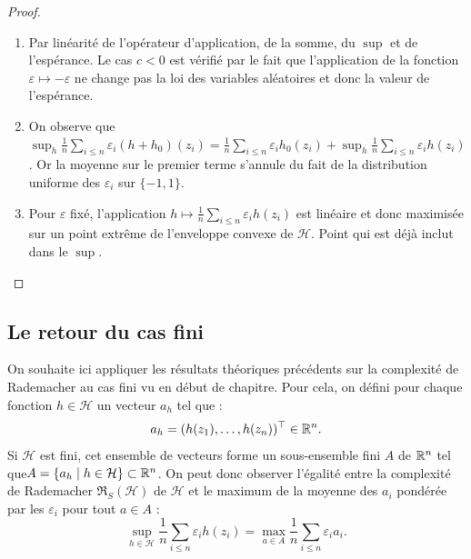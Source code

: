 \begin{proof}
    \begin{enumerate}
        \item Par linéarité de l'opérateur d'application, de la somme, du $\sup$ et de l'espérance. Le cas $c < 0$ est vérifié par le fait que l'application de la fonction $ \varepsilon \longmapsto - \varepsilon$ ne change pas la loi des variables aléatoires et donc la valeur de l'espérance. 
        \item On observe que $ \sup_h \frac{1}{n} \sum_{i \leqslant n} \varepsilon_i (h+h_0)(z_i) = \frac{1}{n} \sum_{i \leqslant n} \varepsilon_i h_0(z_i) + \sup_h \frac{1}{n} \sum_{i \leqslant n} \varepsilon_i h(z_i)$. Or la moyenne sur le premier terme s'annule du fait de la distribution uniforme des $ \varepsilon_i$ sur $\{-1, 1\}$. 
        \item Pour $ \varepsilon$ fixé, l'application $ h \longmapsto \frac{1}{n} \sum_{i \leqslant n} \varepsilon_i h(z_i)$ est linéaire et donc maximisée sur un point extrême de l'enveloppe convexe de $ \mathcal{H}$. Point qui est déjà inclut dans le $ \sup$. 
    \end{enumerate}
\end{proof}

\subsection{Le retour du cas fini}

On souhaite ici appliquer les résultats théoriques précédents sur la complexité de Rademacher au cas fini vu en début de chapitre. Pour cela, on défini pour chaque fonction $ h \in \mathcal{H}$ un vecteur $a_h$ tel que : 
\begin{equation}
    a_h = (h(z_1), \dots, h(z_n))^\top \in \mathbb{R}^n. 
\end{equation}
Si $ \mathcal{H}$ est fini, cet ensemble de vecteurs forme un sous-ensemble fini $A$ de $ \mathbb{R}^n$ tel que$ A = \{a_h \mid h \in \mathcal{H}\} \subset \mathbb{R}^n$. On peut donc observer l'égalité entre la complexité de Rademacher $\mathfrak{R}_S( \mathcal{H})$ de $ \mathcal{H}$ et le maximum de la moyenne des $a_i$ pondérée par les $ \varepsilon_i$ pour tout $a \in A$ : 
\begin{equation}
    \underset{h \in \mathcal{H}}{\sup} \frac{1}{n} \sum_{i \leqslant n} \varepsilon_i h(z_i) = \underset{a \in A}{\max} \frac{1}{n} \sum_{i \leqslant n} \varepsilon_i a_i. \label{eq:rademacher-before-massart}
\end{equation}

